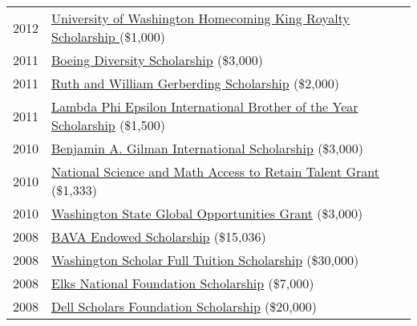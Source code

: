 \documentclass[11pt]{article}
\begin{document}
{{\begin{longtable}{Rp{0.75in}p{5.0in}}
\footnotesize{2012} & \href{https://www.washington.edu/uaa/2013/06/28/oh-the-places-theyll-go-new-grads-and-their-plans/bryan-dosono/}{{University of Washington Homecoming King Royalty Scholarship }}(\$1,000)\\

\footnotesize{2011} & \href{https://ischool.uw.edu/news/2016/12/bryan-dosono-informatics-student-speaks-boeing-scholarship-breakfast}{{Boeing Diversity Scholarship}} (\$3,000)\\

\footnotesize{2011} & \href{https://www.washington.edu/omad/2011/05/17/assunta-ng-student-scholars-honored-at-41st-annual-eop-celebration/}{{Ruth and William Gerberding Scholarship}} (\$2,000)\\

\footnotesize{2011} & \href{http://lambdaphiepsilon.com/resources/\#academicachievement}{{Lambda Phi Epsilon International Brother of the Year Scholarship}} (\$1,500)\\

\footnotesize{2010} & \href{https://depts.washington.edu/uwhonors/news/brief/?id=61}{{Benjamin A. Gilman International Scholarship}} (\$3,000)\\

\footnotesize{2010} & \href{https://web.archive.org/web/20210525151411/https://www2.ed.gov/programs/smart/index.html}{{National Science and Math Access to Retain Talent Grant}} (\$1,333)\\

\footnotesize{2010} & \href{https://www.washington.edu/studyabroad/students/resources/finances/scholarships/}{{Washington State Global Opportunities Grant}} (\$3,000)\\

\footnotesize{2008} & \href{https://web.archive.org/web/20200328042219/https://www.washington.edu/giving/recognition/rtc-2016/top-ten-lists/}{{BAVA Endowed Scholarship}} (\$15,036)\\

\footnotesize{2008} & \href{https://www.wsac.wa.gov/}{{Washington Scholar Full Tuition Scholarship}} (\$30,000)\\

\footnotesize{2008} & \href{https://www.elks.org/enf/scholars/}{{Elks National Foundation Scholarship}} (\$7,000)\\

\footnotesize{2008} & \href{https://www.dellscholars.org/}{{Dell Scholars Foundation Scholarship}} (\$20,000)\\


\end{longtable}}}
\end{document}
